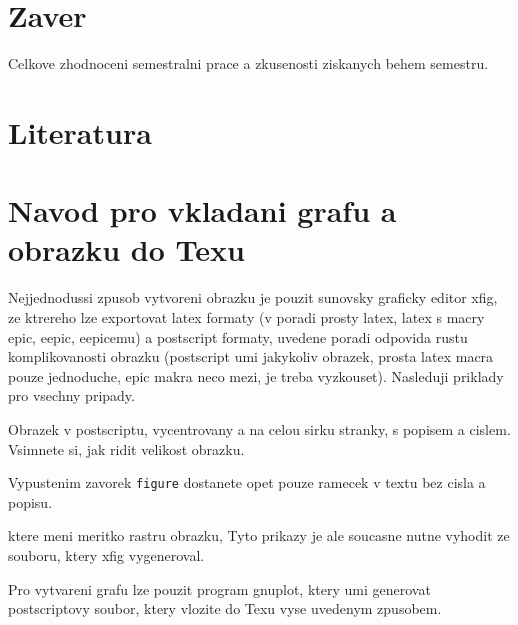 \documentclass[czech]{article}
\begin{document}
\section{Zaver}

Celkove zhodnoceni semestralni prace a zkusenosti ziskanych behem semestru.

\section{Literatura}

\appendix

\section{Navod pro vkladani grafu a obrazku do Texu}

Nejjednodussi zpusob vytvoreni obrazku je pouzit sunovsky graficky editor xfig,
ze ktrereho lze exportovat latex formaty (v poradi prosty latex, 
latex s macry epic, eepic, eepicemu) a postscript formaty,
uvedene poradi odpovida rustu komplikovanosti obrazku
(postscript umi jakykoliv obrazek, prosta latex macra pouze jednoduche,
epic makra neco mezi, je treba vyzkouset). Nasleduji priklady
pro vsechny pripady. 

Obrazek v postscriptu, vycentrovany a na celou sirku stranky, 
s popisem a cislem. Vsimnete si, jak ridit velikost obrazku.


%
Vypustenim zavorek {\tt figure} dostanete opet pouze ramecek 
v textu bez cisla a popisu. 

%
ktere meni meritko rastru obrazku, Tyto prikazy je ale soucasne 
nutne vyhodit ze souboru, ktery xfig vygeneroval.

Pro vytvareni grafu lze pouzit program gnuplot, ktery umi generovat postscriptovy soubor, ktery vlozite
do Texu vyse uvedenym zpusobem.
\end{document}
